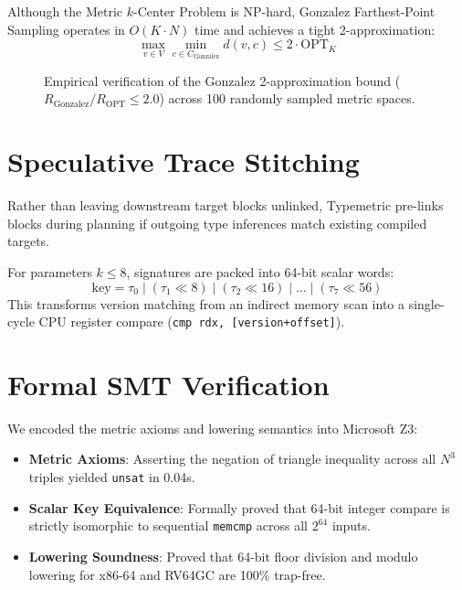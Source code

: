 \documentclass[10pt,journal,compsoc]{IEEEtran}
\begin{document}
Although the Metric $k$-Center Problem is NP-hard, Gonzalez Farthest-Point Sampling \cite{gonzalez1985clustering} operates in $O(K \cdot N)$ time and achieves a tight 2-approximation:
\begin{equation}
\max_{v \in V} \min_{c \in C_{\text{Gonzalez}}} d(v, c) \le 2 \cdot \text{OPT}_K
\end{equation}

\begin{figure}[htbp]
\centering

\caption{Empirical verification of the Gonzalez 2-approximation bound ($R_{\text{Gonzalez}} / R_{\text{OPT}} \le 2.0$) across 100 randomly sampled metric spaces.}
\label{fig:gonzalez}
\end{figure}

\section{Speculative Trace Stitching}

Rather than leaving downstream target blocks unlinked, Typemetric pre-links blocks during planning if outgoing type inferences match existing compiled targets.

For parameters $k \le 8$, signatures are packed into 64-bit scalar words:
\begin{equation}
\text{key} = \tau_0 \mid (\tau_1 \ll 8) \mid (\tau_2 \ll 16) \mid \dots \mid (\tau_7 \ll 56)
\end{equation}
This transforms version matching from an indirect memory scan into a single-cycle CPU register compare (\texttt{cmp rdx, [version+offset]}).

\section{Formal SMT Verification}

We encoded the metric axioms and lowering semantics into Microsoft Z3:
\begin{itemize}
    \item \textbf{Metric Axioms}: Asserting the negation of triangle inequality across all $N^3$ triples yielded \texttt{unsat} in 0.04s.
    \item \textbf{Scalar Key Equivalence}: Formally proved that 64-bit integer compare is strictly isomorphic to sequential \texttt{memcmp} across all $2^{64}$ inputs.
    \item \textbf{Lowering Soundness}: Proved that 64-bit floor division and modulo lowering for x86-64 and RV64GC are 100\% trap-free.
\end{itemize}
\end{document}
